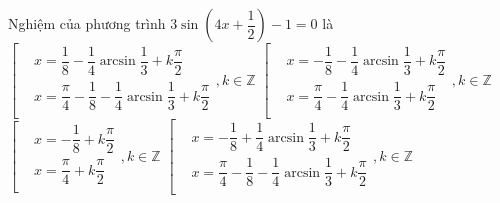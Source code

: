 \begin{ex}%
Nghiệm của phương trình $ 3\sin\left(4x+\dfrac{1}{2}\right)-1=0$ là
\choice
{$\left[\begin{aligned}
& x=\dfrac{1}{8}-\dfrac{1}{4}\arcsin\dfrac{1}{3}+k\dfrac{\pi}{2}\\
& x=\dfrac{\pi}{4}-\dfrac{1}{8}-\dfrac{1}{4}\arcsin\dfrac{1}{3}+k\dfrac{\pi}{2}\\
\end{aligned}\right.,k\in\mathbb{Z}$}
{$\left[\begin{aligned}
& x=-\dfrac{1}{8}-\dfrac{1}{4}\arcsin\dfrac{1}{3}+k\dfrac{\pi}{2}\\
& x=\dfrac{\pi}{4}-\dfrac{1}{4}\arcsin\dfrac{1}{3}+k\dfrac{\pi}{2}\\
\end{aligned}\right.,k\in\mathbb{Z}$}
{$\left[\begin{aligned}
& x=-\dfrac{1}{8}+k\dfrac{\pi}{2}\\
& x=\dfrac{\pi}{4}+k\dfrac{\pi}{2}\\
\end{aligned}\right.,k\in\mathbb{Z}$}
{\True $\left[\begin{aligned}
& x=-\dfrac{1}{8}+\dfrac{1}{4}\arcsin\dfrac{1}{3}+k\dfrac{\pi}{2}\\
& x=\dfrac{\pi}{4}-\dfrac{1}{8}-\dfrac{1}{4}\arcsin\dfrac{1}{3}+k\dfrac{\pi}{2}\\
\end{aligned}\right.,k\in\mathbb{Z}$}
\loigiai{
$ 3\sin\left(4x+\dfrac{1}{2}\right)-1=0\Leftrightarrow\sin\left(4x+\dfrac{1}{2}\right)=\dfrac{1}{3}\Leftrightarrow\left[\begin{aligned}
& 4x+\dfrac{1}{2}=\arcsin\dfrac{1}{3}+2k\pi\\
& 4x+\dfrac{1}{2}=\pi-\arcsin\dfrac{1}{3}+2k\pi\\
\end{aligned}\right.,k\in\mathbb{Z}$\\
$\Leftrightarrow\left[\begin{aligned}
& x=-\dfrac{1}{8}+\dfrac{1}{4}\arcsin\dfrac{1}{3}+k\dfrac{\pi}{2}\\
& x=\dfrac{\pi}{4}-\dfrac{1}{8}-\dfrac{1}{4}\arcsin\dfrac{1}{3}+k\dfrac{\pi}{2}\\
\end{aligned}\right.,k\in\mathbb{Z}$}
\end{ex}


